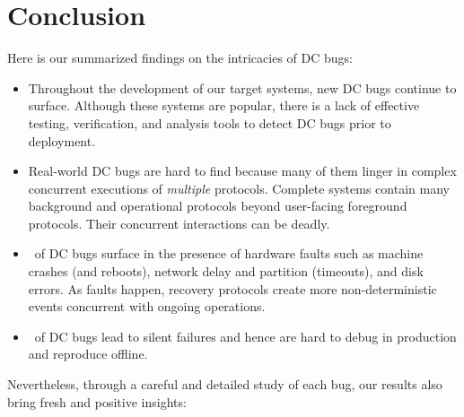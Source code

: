 
\section{Conclusion}

Here is our summarized findings on the intricacies of DC bugs:

\begin{itemize}
\item Throughout the development of our target systems, new DC bugs
continue to surface.  Although these systems are popular, there is a
lack of effective testing, verification, and analysis tools to detect
DC bugs prior to deployment.

\item Real-world DC bugs are hard to find because many of them linger
in complex concurrent executions of {\em multiple} protocols.
Complete systems contain many background and operational
protocols beyond user-facing foreground protocols.  Their concurrent
interactions can be deadly.

\item \pctFaultYes\ of DC bugs surface in the presence of hardware
faults such as machine crashes (and reboots), network delay and
partition (timeouts), and disk errors.  As faults happen, recovery
protocols create more non-deterministic events concurrent with ongoing
operations.

\item \pctErrImp\ of DC bugs lead to silent failures and hence are hard
to debug in production and reproduce offline.

\end{itemize}


Nevertheless, through a careful and detailed study of each bug,
our results also bring fresh and positive insights:



